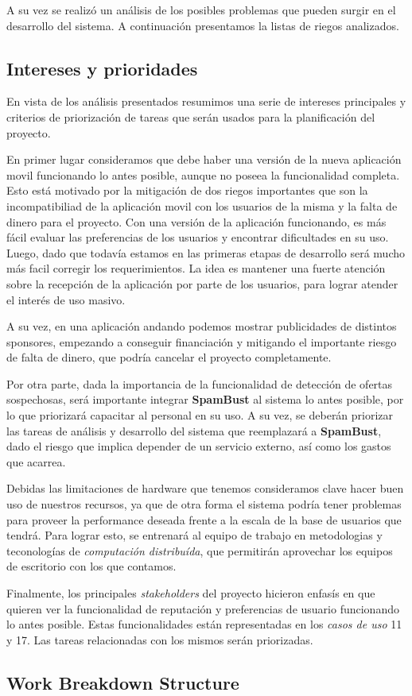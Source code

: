 \documentclass[10pt, a4paper]{article}
\begin{document}
A su vez se realizó un análisis de los posibles problemas que pueden surgir en el desarrollo del sistema. A continuación presentamos la listas de riegos analizados.



\subsection{Intereses y prioridades}

En vista de los análisis presentados resumimos una serie de intereses principales y criterios de priorización de tareas que serán usados para la planificación del proyecto. 

En primer lugar consideramos que debe haber una versión de la nueva aplicación movil funcionando lo antes posible, aunque no poseea la funcionalidad completa. Esto está motivado por la mitigación de dos riegos importantes que son la incompatibiliad de la aplicación movil con los usuarios de la misma y la falta de dinero para el proyecto. Con una versión de la aplicación funcionando, es más fácil evaluar las preferencias de los usuarios y encontrar dificultades en su uso. Luego, dado que todavía estamos en las primeras etapas de desarrollo será mucho más facil corregir los requerimientos. La idea es mantener una fuerte atención sobre la recepción de la aplicación por parte de los usuarios, para lograr atender el interés de uso masivo.

A su vez, en una aplicación andando podemos mostrar publicidades de distintos sponsores, empezando a conseguir financiación y mitigando el importante riesgo de falta de dinero, que podría cancelar el proyecto completamente.

Por otra parte, dada la importancia de la funcionalidad de detección de ofertas sospechosas, será importante integrar \textbf{SpamBust} al sistema lo antes posible, por lo que priorizará capacitar al personal en su uso. A su vez, se deberán priorizar las tareas de análisis y desarrollo del sistema que reemplazará a \textbf{SpamBust}, dado el riesgo que implica depender de un servicio externo, así como los gastos que acarrea. 

Debidas las limitaciones de hardware que tenemos consideramos clave hacer buen uso de nuestros recursos, ya que de otra forma el sistema podría tener problemas para proveer la performance deseada frente a la escala de la base de usuarios que tendrá. Para lograr esto, se entrenará al equipo de trabajo en metodologias y teconologías de \emph{computación distribuída}, que permitirán aprovechar los equipos de escritorio con los que contamos. 

Finalmente, los principales \emph{stakeholders} del proyecto hicieron enfasís en que quieren ver la funcionalidad de reputación y preferencias de usuario funcionando lo antes posible. Estas funcionalidades están representadas en los \emph{casos de uso} 11 y 17. Las tareas relacionadas con los mismos serán priorizadas.

\subsection{Work Breakdown Structure}


\end{document}
